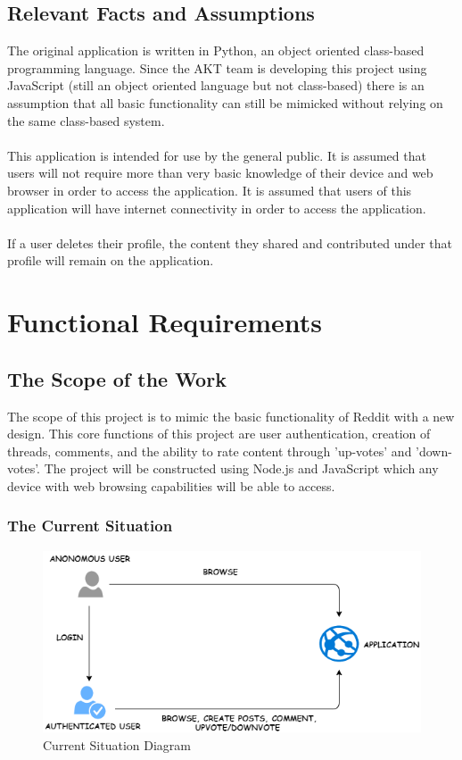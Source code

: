 \documentclass[12pt,fleqn]{article}
\begin{document}
\subsection {Relevant Facts and Assumptions}

The original application is written in Python, an object oriented class-based programming language.  Since the AKT team is developing this project using JavaScript (still an object oriented language but not class-based) there is an assumption that all basic functionality can still be mimicked without relying on the same class-based system. \\ \\
This application is intended for use by the general public.  It is assumed that users will not require more than very basic knowledge of their device and web browser in order to access the application.  It is assumed that users of this application will have internet connectivity in order to access the application.\\ \\ 
If a user deletes their profile, the content they shared and contributed under that profile will remain on the application.

\pagebreak


\section {Functional Requirements}

\subsection {The Scope of the Work}
The scope of this project is to mimic the basic functionality of Reddit with a new design. This core functions of this project are user authentication, creation of threads, comments, and the ability to rate content through ’up-votes’ and ’down-votes’. The project will be constructed using Node.js and JavaScript which any device with web browsing capabilities will be able to access.

\subsubsection{The Current Situation}

\begin{figure}[htp]
\centering
\includegraphics[width=19cm]{situation}
\caption{Current Situation Diagram}
\label{fig:env}
\end{figure}
\end{document}
